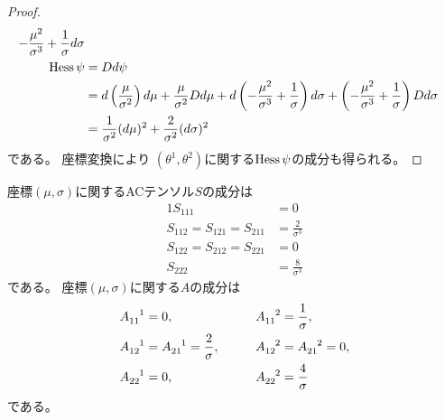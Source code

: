 \documentclass[report]{jlreq}
\begin{document}
\begin{proof}
\begin{alignat}{1}
{                    - \frac{\mu^2}{\sigma^3}
                    + \frac{1}{\sigma}
                }
                d\sigma
                \\
        \operatorname{Hess}\psi
            &=
                Dd\psi
                \\
            &=
                d\left({
                    \frac{\mu}{\sigma^2}
                }\right)
                d\mu
                + \frac{\mu}{\sigma^2} Dd\mu
                + d\left({
                    - \frac{\mu^2}{\sigma^3}
                    + \frac{1}{\sigma}
                }\right)
                d\sigma
                + \left({
                    - \frac{\mu^2}{\sigma^3}
                    + \frac{1}{\sigma}
                }\right)
                Dd\sigma
                \\
            &=
                \frac{1}{\sigma^2} (d\mu)^2
                + \frac{2}{\sigma^2} (d\sigma)^2
    \end{alignat}
    である。
    座標変換により
    $(\theta^1, \theta^2)$に関する$\operatorname{Hess}\psi$の成分も得られる。
\end{proof}

\begin{proposition}[ACテンソルの成分]
    座標$(\mu, \sigma)$に関するACテンソル$S$の成分は
    \begin{alignat}{1}
        S_{111}
            &=
                0
                \\
        S_{112} = S_{121} = S_{211}
            &=
                \frac{2}{\sigma^3}
                \\
        S_{122} = S_{212} = S_{221}
            &=
                0
                \\
        S_{222}
            &=
                \frac{8}{\sigma^3}
    \end{alignat}
    である。
    座標$(\mu, \sigma)$に関する$A$の成分は
    \begin{alignat}{2}
        A_{11}^{\hphantom{11}1}
            &=
                0,
                \qquad
        &A_{11}^{\hphantom{11}2}
            &=
                \frac{1}{\sigma},
                \\
        A_{12}^{\hphantom{12}1}
            &=
                A_{21}^{\hphantom{21}1}
            =
                \frac{2}{\sigma},
                \qquad
        &A_{12}^{\hphantom{12}2}
            &=
                A_{21}^{\hphantom{21}2}
            =
                0,
                \\
        A_{22}^{\hphantom{22}1}
            &=
                0,
                \qquad
        &A_{22}^{\hphantom{22}2}
            &=
                \frac{4}{\sigma}
    \end{alignat}
    である。
\end{proposition}
\end{document}
